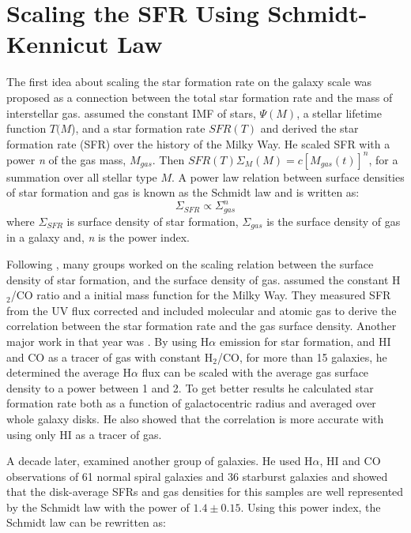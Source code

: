 
\section{Scaling the SFR Using Schmidt-Kennicut Law}

The first idea about scaling the star formation rate on the galaxy scale was proposed as a connection between the total star formation rate and the mass of interstellar gas. \cite{Schmidt59} assumed the constant IMF of stars, $\Psi (M)$, a stellar lifetime function {$T(M$)}, and a star formation rate {$SFR(T)$} and derived the star formation rate (SFR) over the history of the Milky Way. He scaled SFR with a power {\it n} of the gas mass, $M_{gas}$. Then $SFR(T)\Sigma_{M}(M) = c[M_{gas}(t)]^n$, for a summation over all stellar type $M$. A power law relation between surface densities of star formation and gas is known as the Schmidt law and is written as:
\begin{equation}
\Sigma_{SFR} \propto \Sigma_{gas}^n
\end{equation}
where $\Sigma_{SFR}$ is surface density of star formation, $\Sigma_{gas}$ is the surface density of gas in a galaxy and, {\it n} is the power index.

Following \cite{Schmidt59}, many groups worked on the scaling relation between the surface density of star formation, and the surface density of gas. \cite{Buat89} assumed the constant H$_2$/CO ratio and a \cite{Scalo86} initial mass function for the Milky Way. They measured SFR from the UV flux corrected and included molecular and atomic gas to derive the correlation between the star formation rate and the gas surface density. Another major work in that year was \cite{Kennicutt89}. By using H$\alpha$ emission for star formation, and HI and CO as a tracer of gas with constant H$_2$/CO, for more than 15 galaxies, he determined the average H$\alpha$ flux can be scaled with the average gas surface density to a power between 1 and 2.  To get better results he calculated star formation rate both as a function of galactocentric radius and averaged over whole galaxy disks. He also showed that the correlation is more accurate with using only HI as a tracer of gas. 

A decade later, \cite{Kennicutt98a} examined another group of galaxies. He used H$\alpha$, HI and CO observations of 61 normal spiral galaxies and 36 starburst galaxies and showed that the disk-average SFRs and gas densities for this samples are well represented by the Schmidt law with the power of $1.4 \pm 0.15$. Using this power index, the Schmidt law can be rewritten as:

